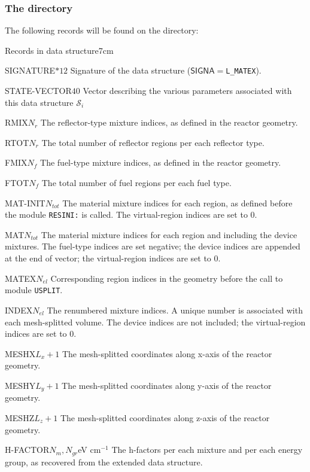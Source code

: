 \subsubsection{The  directory}\label{sect:matexdir}

\noindent
The following records will be found on the  directory:

\begin{DescriptionEnregistrement}{Records in  data structure}{7cm} 

\CharEnr
 {SIGNATURE}{$*12$}
 {Signature of the  data structure ($\mathsf{SIGNA}=${\tt L\_MATEX}).}

\IntEnr
 {STATE-VECTOR}{$40$}
 {Vector describing the various parameters associated with this data structure $\mathcal{S}_i$}

\IntEnr
 {RMIX}{$N_r$}
 {The reflector-type mixture indices, as defined in the reactor geometry.}

\IntEnr
 {RTOT}{$N_r$}
 {The total number of reflector regions per each reflector type.}

\IntEnr
 {FMIX}{$N_f$}
 {The fuel-type mixture indices, as defined in the reactor geometry.}

\IntEnr
 {FTOT}{$N_f$}
 {The total number of fuel regions per each fuel type.}

\IntEnr
 {MAT-INIT}{$N_{tot}$}
 {The material mixture indices for each region, as defined before the module
 {\tt RESINI:} is called. The virtual-region indices are set to 0.}

\IntEnr
 {MAT}{$N_{tot}$}
 {The material mixture indices for each region and including the device
  mixtures. The fuel-type indices are set negative; the device indices are
  appended at the end of vector; the virtual-region indices are set to 0.}

\IntEnr
 {MATEX}{$N_{el}$}
 {Corresponding region indices in the geometry before the call to module {\tt USPLIT}.}

\IntEnr
 {INDEX}{$N_{el}$}
 {The renumbered mixture indices. A unique number is associated
  with each mesh-splitted volume. The device indices are not included;
  the virtual-region indices are set to 0.}

\RealEnr
 {MESHX}{$L_x+1$}{}
 {The mesh-splitted coordinates along x-axis of the reactor geometry.}

\RealEnr
 {MESHY}{$L_y+1$}{}
 {The mesh-splitted coordinates along y-axis of the reactor geometry.}

\RealEnr
 {MESHZ}{$L_z+1$}{}
 {The mesh-splitted coordinates along z-axis of the reactor geometry.}

\RealEnr
 {H-FACTOR}{$N_m, N_{gr}$}{eV cm$^{-1}$}
 {The h-factors per each mixture and per each energy group,
  as recovered from the extended  data structure.}

\end{DescriptionEnregistrement}
\clearpage
